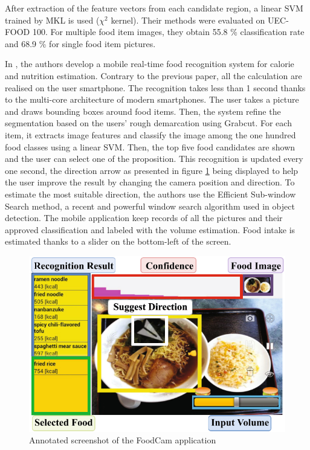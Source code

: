 After extraction of the feature vectors from each candidate region, a linear SVM trained by MKL is used ($\chi^2$ kernel). Their methods were evaluated on UEC-FOOD 100. For multiple food item images, they obtain 55.8 \% classification rate and 68.9 \% for single food item pictures.


In \cite{Kawano2014a}, the authors develop a mobile real-time food recognition system for calorie and nutrition estimation. Contrary to the previous paper, all the calculation are realised on the user smartphone. The recognition takes less than 1 second thanks to the multi-core architecture of modern smartphones.
The user takes a picture and draws bounding boxes around food items. Then, the system refine the segmentation based on the users' rough demarcation using Grabcut.
For each item, it extracts image features and classify the image among the one hundred food classes using a linear SVM. Then, the top five food candidates are shown and the user can select one of the proposition.
This recognition is updated every one second, the direction arrow as presented in figure  \ref{fig:food_cam} being displayed to help the user improve the result by changing the camera position and direction. To estimate the most suitable direction, the authors use the Efficient Sub-window Search method, a recent and powerful window search algorithm used in object detection.
The mobile application keep records of all the pictures and their approved classification and labeled with the volume estimation. Food intake is estimated thanks to a slider on the bottom-left of the screen.

\begin{figure}
    \centering
    \includegraphics[scale=0.6]{img/foodcam.jpg}
    \caption{Annotated screenshot of the FoodCam application}
    \label{fig:food_cam}
\end{figure}

